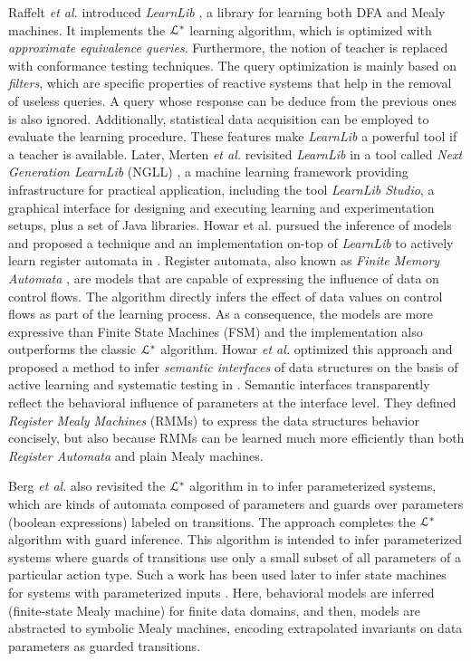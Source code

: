 Raffelt \emph{et al.} introduced \textit{LearnLib}
\cite{Raffelt:2005:LLA:1081180.1081189}, a library for learning
both DFA and Mealy machines. It implements the $\EuScript{L}^*$
\cite{Angluin198787} learning algorithm, which is optimized with
\textit{approximate equivalence queries}. Furthermore, the
notion of teacher is replaced with conformance testing
techniques. The query optimization is mainly based on
\textit{filters}, which are specific properties of reactive
systems that help in the removal of useless queries. A query
whose response can be deduce from the previous ones is also
ignored. Additionally, statistical data acquisition can be
employed to evaluate the learning procedure. These features make
\textit{LearnLib} a powerful tool if a teacher is available.
Later, Merten \emph{et al.} revisited \textit{LearnLib} in a tool called
\textit{Next Generation LearnLib} (NGLL) \cite{ngll11}, a machine
learning framework providing infrastructure for practical
application, including the tool \textit{LearnLib Studio}, a
graphical interface for designing and executing learning and
experimentation setups, plus a set of Java libraries. Howar et
al. pursued the inference of models  and proposed a technique and
an implementation on-top of \textit{LearnLib} to actively learn
register automata in \cite{howarRA2012}. Register automata, also
known as \textit{Finite Memory Automata} \cite{Kaminski1994329},
are models that are capable of expressing the influence of data
on control flows. The algorithm directly infers the effect of
data values on control flows as part of the learning process. As
a consequence, the models are more expressive than Finite State
Machines (FSM) and the implementation also  outperforms the
classic $\EuScript{L}^*$ algorithm. Howar \emph{et al.} optimized this
approach and proposed a method to infer \textit{semantic
interfaces} of data structures on the basis of active learning
and systematic testing in \cite{howar2012}. Semantic interfaces
transparently reflect the behavioral influence of parameters at
the interface level.  They defined \textit{Register Mealy
Machines} (RMMs) to express the data structures behavior
concisely, but also because RMMs can be learned much more
efficiently than both \textit{Register Automata} and plain Mealy
machines.

Berg \emph{et al.} also revisited the $\EuScript{L}^*$ algorithm in
\cite{regularinfBerg06} to infer parameterized systems, which are
kinds of automata composed of parameters and guards over
parameters (boolean expressions) labeled on transitions. The
approach completes the  $\EuScript{L}^*$ algorithm with guard
inference. This algorithm is intended to infer parameterized
systems where guards of transitions use only a small subset of
all parameters of a particular action type. Such a work has been
used later to infer state machines for systems with parameterized
inputs \cite{regularinfBerg08}. Here, behavioral models are
inferred (finite-state Mealy machine) for finite data domains,
and then, models are abstracted to symbolic Mealy machines,
encoding extrapolated invariants on data parameters as guarded
transitions.

